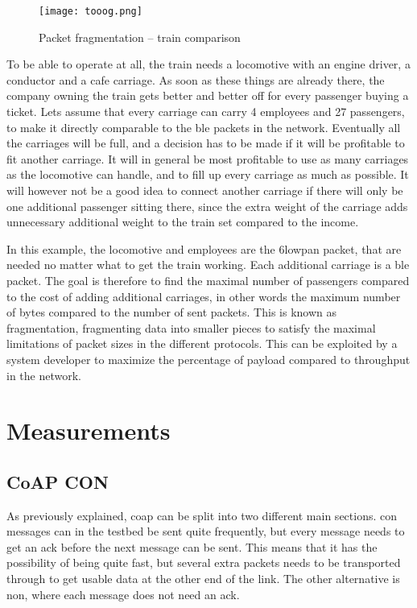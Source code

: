 \begin{figure}[ht]
    \centering
    \texttt{[image: tooog.png]}    
    \caption{Packet fragmentation -- train comparison}
    \label{fig:trainExample}
\end{figure}

\noindent To be able to operate at all, the train needs a locomotive with an engine driver, a conductor and a cafe carriage. As soon as these things are already there, the company owning the train gets better and better off for every passenger buying a ticket. Lets assume that every carriage can carry 4 employees and 27 passengers, to make it directly comparable to the \gls{ble} packets in the network. Eventually all the carriages will be full, and a decision has to be made if it will be profitable to fit another carriage. It will in general be most profitable to use as many carriages as the locomotive can handle, and to fill up every carriage as much as possible. It will however not be a good idea to connect another carriage if there will only be one additional passenger sitting there, since the extra weight of the carriage adds unnecessary additional weight to the train set compared to the income. 

\noindent In this example, the locomotive and employees are the \gls{6lowpan} packet, that are needed no matter what to get the train working. Each additional carriage is a \gls{ble} packet. The goal is therefore to find the maximal number of passengers compared to the cost of adding additional carriages, in other words the maximum number of bytes compared to the number of sent packets. This is known as fragmentation, fragmenting data into smaller pieces to satisfy the maximal limitations of packet sizes in the different protocols. This can be exploited by a system developer to maximize the percentage of \gls{payload} compared to \gls{throughput} in the network.
 
\newpage

\section{Measurements}

\subsection{CoAP CON}

\noindent As previously explained, \gls{coap} can be split into two different main sections. \gls{con} messages can in the testbed be sent quite frequently, but every message needs to get an \gls{ack} before the next message can be sent. This means that it has the possibility of being quite fast, but several extra packets needs to be transported through to get usable data at the other end of the link. The other alternative is \gls{non}, where each message does not need an \gls{ack}. 


